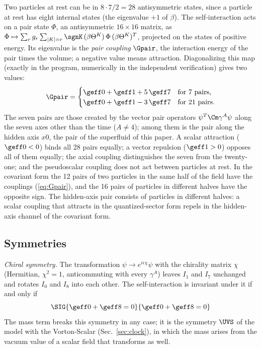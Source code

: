 Two particles at rest can be in $8\cdot7/2=28$ antisymmetric states, since a particle at rest has
eight internal states (the eigenvalue $+1$ of $\beta$). The self-interaction acts on a pair state
$\Phi$, an antisymmetric $16\times16$ matrix, as
$\Phi\mapsto\sum_rg_r\sum_{|K|=r}\sgnK\,(\beta\Theta^{K})\,\Phi\,(\beta\Theta^{K})^{T}$,
projected on the states of positive energy. Its eigenvalue is the \emph{pair coupling} $\Gpair$,
the interaction energy of the pair times the volume; a negative value means attraction. Diagonalizing
this map (exactly in the program, numerically in the independent verification) gives two values:
\begin{equation}
\Gpair=\begin{cases}\geff0+\geff1+5\,\geff7&\text{for 7 pairs,}\\ \geff0+\geff1-3\,\geff7&\text{for 21 pairs.}\end{cases}
\label{eq:Gpair}
\end{equation}
The seven pairs are those created by the vector pair operators $\psi^{T}\Cm\gamma^{A}\psi$ along
the seven axes other than the time ($A\neq4$); among them is the pair along the hidden axis $x0$,
the pair of the superfluid of this paper. A scalar attraction ($\geff0<0$) binds all 28 pairs equally; a vector repulsion
($\geff1>0$) opposes all of them equally; the axial coupling distinguishes the seven from the
twenty-one; and the pseudoscalar coupling does not act between particles at rest.
In the covariant form the 12 pairs of two particles in the same half of the field have the couplings
(\ref{eq:Gpair}), and the 16 pairs of particles in different halves have the opposite sign. The
hidden-axis pair consists of particles in different halves: a scalar coupling that attracts in the
quantized-sector form repels in the hidden-axis channel of the covariant form.

\subsection{Symmetries}
\label{sec:selfsym}

\emph{Chiral symmetry.} The transformation $\psi\to e^{i\epsilon\chi}\psi$ with the chirality matrix
$\chi$ (Hermitian, $\chi^{2}=1$, anticommuting with every $\gamma^{A}$) leaves $I_1$ and $I_7$
unchanged and rotates $I_0$ and $I_8$ into each other. The self-interaction is invariant under it
if and only if
\begin{equation}
\SIG{\geff0+\geff8=0}{\geff0+\geff8=0}
\label{eq:chiralcond}
\end{equation}
The
mass term breaks this symmetry in any case; it is the symmetry $\UVS$ of the model with the
Vorton-Scalar (Sec.~\ref{sec:clock}), in which the mass arises from the vacuum value of a scalar
field that transforms as well.

